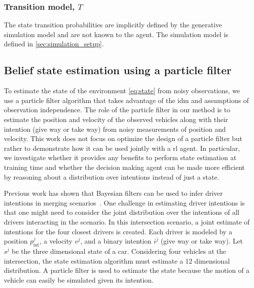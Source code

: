 \subsubsection{Transition model, $T$}
The state transition probabilities are implicitly defined by the generative simulation model and are not known to the agent. The simulation model is defined in \ref{sec:simulation_setup}. 

\subsection{Belief state estimation using a particle filter}
\label{sec:particle_filter}

To estimate the state of the environment \ref{eq:state} from noisy observations, we use a particle filter algorithm that takes advantage of the \gls{idm} and assumptions of observation independence. 
The role of the particle filter in our method is to estimate the position and velocity of the observed vehicles along with their intention (give way or take way) from noisy measurements of position and velocity. 
This work does not focus on optimize the design of a particle filter but rather to demonstrate how it can be used jointly with a \gls{rl} agent. 
In particular, we investigate whether it provides any benefits to perform state estimation at training time and whether the decision making agent can be made more efficient by reasoning about a distribution over intentions instead of just a state. 

Previous work has shown that Bayesian filters can be used to infer driver intentions in merging scenarios~\cite{bouton2019}. 
One challenge in estimating driver intentions is that one might need to consider the joint distribution over the intentions of all drivers interacting in the scenario. 
In this intersection scenario, a joint estimate of intentions for the four closest drivers is created.
Each driver is modeled by a position $p^j_\text{int}$, a velocity $v^j$, and a binary intention $i^j$ (give way or take way). 
Let $s^j$ be the three dimensional state of a car. 
Considering four vehicles at the intersection, the state estimation algorithm must estimate a \num{12} dimensional distribution. A particle filter is used to estimate the state because the motion of a vehicle can easily be simulated given its intention.%

